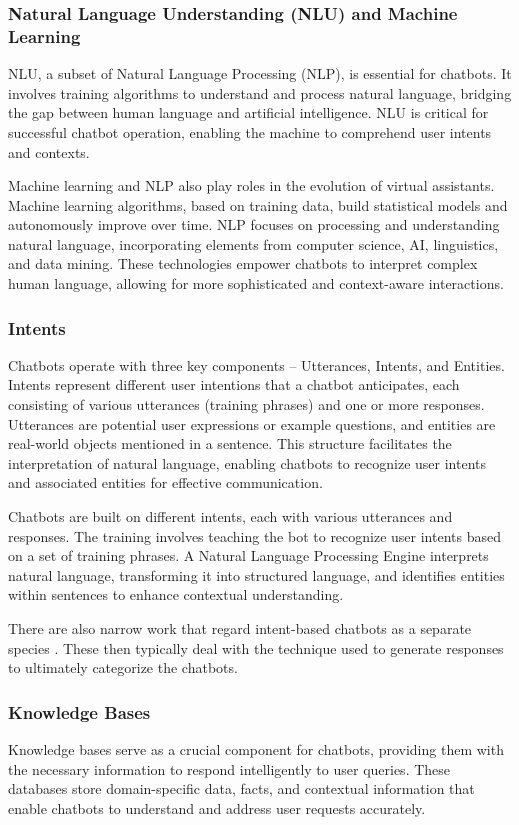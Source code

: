 \subsubsection{Natural Language Understanding (NLU) and Machine Learning}
NLU, a subset of Natural Language Processing (NLP), is essential for chatbots.
It involves training algorithms to understand and process natural language, bridging the gap between human language and artificial intelligence. 
NLU is critical for successful chatbot operation, enabling the machine to comprehend user intents and contexts.

Machine learning and NLP also play roles in the evolution of virtual assistants. 
Machine learning algorithms, based on training data, build statistical models and autonomously improve over time.
NLP focuses on processing and understanding natural language, incorporating elements from computer science, AI, linguistics, and data mining. 
These technologies empower chatbots to interpret complex human language, allowing for more sophisticated and context-aware interactions.

\subsubsection{Intents}
Chatbots operate with three key components – Utterances, Intents, and Entities. Intents represent different user intentions that a chatbot anticipates, each consisting of various utterances (training phrases) and one or more responses. Utterances are potential user expressions or example questions, and entities are real-world objects mentioned in a sentence. This structure facilitates the interpretation of natural language, enabling chatbots to recognize user intents and associated entities for effective communication.

Chatbots are built on different intents, each with various utterances and responses. 
The training involves teaching the bot to recognize user intents based on a set of training phrases. 
A Natural Language Processing Engine interprets natural language, transforming it into structured language, and identifies entities within sentences to enhance contextual understanding.

There are also narrow work that regard intent-based chatbots as a separate species \cite{luo_critical_2022}. 
These then typically deal with the technique used to generate responses to ultimately categorize the chatbots.

\subsubsection{Knowledge Bases}
Knowledge bases serve as a crucial component for chatbots, providing them with the necessary information to respond intelligently to user queries. 
These databases store domain-specific data, facts, and contextual information that enable chatbots to understand and address user requests accurately.

